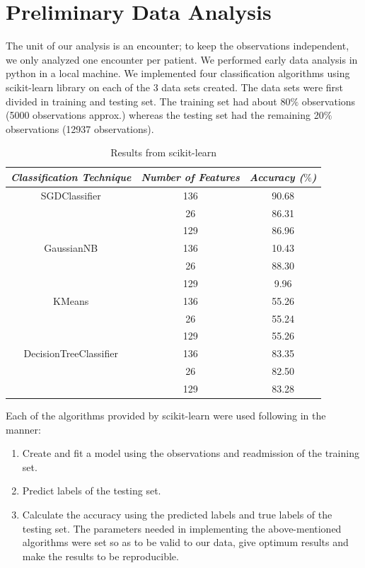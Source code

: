 \documentclass[9pt,twocolumn,twoside]{../../styles/osajnl}
\begin{document}
\section{Preliminary Data Analysis}
The unit of our analysis is an encounter; to keep the observations independent, we only analyzed one encounter per patient.
We performed early data analysis in python in a local machine. We implemented four classification algorithms using scikit-learn library on each of the 3 data sets created. The data sets were first divided in training and testing set. The training set had about 80$\%$ observations (5000 observations approx.) whereas the testing set had the remaining 20$\%$ observations (12937 observations). 
\begin{table}[h!]
\centering
 \begin{tabular}{|c c c|} 
 \hline
 \textit{Classification Technique} & \textit{Number of Features} & \textit{Accuracy ($\%$)}\\ 
 \hline
 \hline 
  SGDClassifier & 136 & 90.68 \\  & 26 & 86.31\\
  & 129 & 86.96\\
 \hline 
  GaussianNB & 136 & 10.43 \\  & 26 & 88.30\\
  & 129 & 9.96\\ 
 \hline 
   KMeans & 136 & 55.26 \\ 
   & 26 & 55.24\\
  & 129 & 55.26\\ 
 \hline 
DecisionTreeClassifier & 136 & 83.35 \\ & 26 & 82.50\\
  & 129 & 83.28\\
\hline 
\end{tabular}
\caption{Results from scikit-learn}
\label{table:sklearn}
\end{table}


Each of the algorithms provided by scikit-learn were used following in the manner:
\begin{enumerate}
\item Create and fit a model using the observations and readmission of the training set.
\item Predict labels of the testing set.
\item Calculate the accuracy using the predicted labels and true labels of the testing set. The parameters needed in implementing the above-mentioned algorithms were set so as to be valid to our data, give optimum results and make the results to be reproducible.
\end{enumerate}
\end{document}
